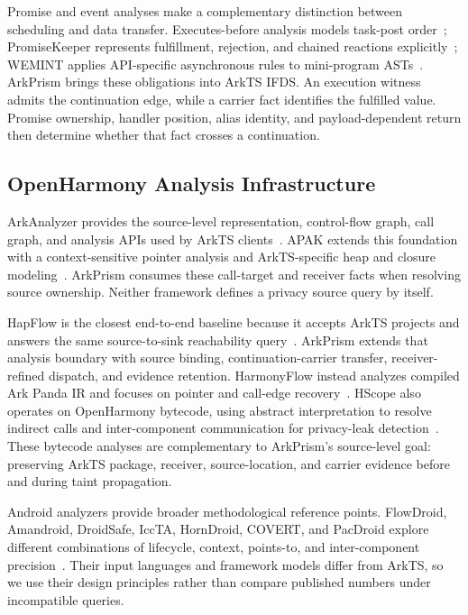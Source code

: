 Promise and event analyses make a complementary distinction between scheduling and data transfer. Executes-before analysis models task-post order~\cite{executesbefore}; PromiseKeeper represents fulfillment, rejection, and chained reactions explicitly~\cite{promisekeeper}; WEMINT applies API-specific asynchronous rules to mini-program ASTs~\cite{wemint}. ArkPrism brings these obligations into ArkTS IFDS. An execution witness admits the continuation edge, while a carrier fact identifies the fulfilled value. Promise ownership, handler position, alias identity, and payload-dependent return then determine whether that fact crosses a continuation.

\subsection{OpenHarmony Analysis Infrastructure}

ArkAnalyzer provides the source-level representation, control-flow graph, call graph, and analysis APIs used by ArkTS clients~\cite{arkanalyzer}. APAK extends this foundation with a context-sensitive pointer analysis and ArkTS-specific heap and closure modeling~\cite{arktsPointer}. ArkPrism consumes these call-target and receiver facts when resolving source ownership. Neither framework defines a privacy source query by itself.

HapFlow is the closest end-to-end baseline because it accepts ArkTS projects and answers the same source-to-sink reachability query~\cite{hapflow}. ArkPrism extends that analysis boundary with source binding, continuation-carrier transfer, receiver-refined dispatch, and evidence retention. HarmonyFlow instead analyzes compiled Ark Panda IR and focuses on pointer and call-edge recovery~\cite{harmonyflow}. HScope also operates on OpenHarmony bytecode, using abstract interpretation to resolve indirect calls and inter-component communication for privacy-leak detection~\cite{hscope}. These bytecode analyses are complementary to ArkPrism's source-level goal: preserving ArkTS package, receiver, source-location, and carrier evidence before and during taint propagation.

Android analyzers provide broader methodological reference points. FlowDroid, Amandroid, DroidSafe, IccTA, HornDroid, COVERT, and PacDroid explore different combinations of lifecycle, context, points-to, and inter-component precision~\cite{arzt14,wei2018amandroid,gordon2015droidsafe,iccta,horndroid,covert,pacdroid}. Their input languages and framework models differ from ArkTS, so we use their design principles rather than compare published numbers under incompatible queries.


